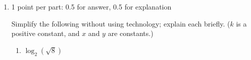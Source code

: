 \documentclass{article}
\begin{document}
\begin{enumerate}
\begin{enumerate}
  \item
    \begin{problem}[\vfill]
      $\log_{10} (0.05)$
    \end{problem}

    \begin{solution}
      ,
      since $\log_{10} (.05) $ is the number we must raise 10 to in order to get .05, and $10^{-2}< .05 < 10^{-1}$.
    \end{solution}

  \item
    \begin{problem}[\vfill]
      $\ln 3$
    \end{problem}

    \begin{solution}
      $\ln 3 = \log_e 3$ is the power we must raise $e$ to in order to get 3. Since we knew $e$ is between 2 and 3, we can be sure that $e^1 < 3 < e^2$, so $\boxed{1 < \ln 3 < 2}$.
    \end{solution}

  \item
    \begin{problem}[\vfill\newpage]
      $\ln \left( \dfrac{1}{2} \right)$
    \end{problem}

    \begin{solution}
      $\ln(\frac{1}{2})$ is the number we must raise $e$ to in order
       to get $\frac{1}{2}$. 
       Since $e\approx 2.7$, we know that $e^{-1} < \frac{1}{2} < e^0$.
       Therefore 
      .
    \end{solution}

  \end{enumerate}

\item %

  \begin{grading}
    1 point per part: 0.5 for answer, 0.5 for explanation
  \end{grading}

  Simplify the following without using technology; explain each briefly. ($k$ is a positive constant, and $x$ and $y$ are constants.)

  \begin{enumerate}
  \item
    \begin{problem}[\vfill]
      $\log_2 \left( \sqrt{8} \right)$
    \end{problem}


\end{enumerate}
\end{enumerate}
\end{document}
